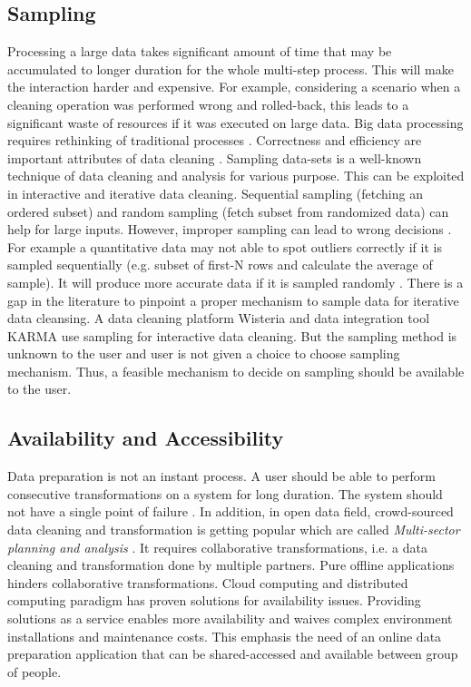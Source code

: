 \subsection{Sampling}
\noindent Processing a large data takes significant amount of time that may be accumulated to longer duration for the whole multi-step process. This will make the interaction harder and expensive. For example, considering a scenario when a cleaning operation was performed wrong and rolled-back, this leads to a significant waste of resources if it was executed on large data. Big data processing requires rethinking of traditional processes \cite{nemreport}. Correctness and efficiency are important attributes of data cleaning \cite{journals/corr/KrishnanW0FG16}. Sampling data-sets is a well-known technique of data cleaning and analysis \cite{Hellerstein08quantitativedata} for various purpose. This can be exploited in interactive and iterative data cleaning. Sequential sampling (fetching an ordered subset) and random sampling (fetch subset from randomized data) can help for large inputs. However, improper sampling can lead to wrong decisions \cite{journals/corr/KrishnanW0FG16}. For example a quantitative data may not able to spot outliers correctly if it is sampled sequentially (e.g. subset of first-N rows and calculate the average of sample). It will produce more accurate data if it is sampled randomly \cite{Hellerstein08quantitativedata}. There is a gap in the literature to pinpoint a proper mechanism to sample data for iterative data cleansing. A data cleaning platform Wisteria \cite{Wisteria} and data integration tool KARMA  \cite{knoblock15:aimag} use sampling for interactive data cleaning. But the sampling method is unknown to the user and user is not given a choice to choose sampling mechanism.  Thus, a feasible mechanism to decide on sampling should be available to the user.
\subsection{Availability and Accessibility}
\noindent Data preparation is not an instant process. A user should be able to perform consecutive transformations on a system for long duration. The system should not have a single point of failure \cite{mesa}.  In addition, in open data field, crowd-sourced data cleaning and transformation is getting popular which are called \textit{Multi-sector planning and analysis} \cite{multisectoranalysis}. It requires collaborative transformations, i.e. a data cleaning and transformation done by multiple partners. Pure offline applications hinders collaborative transformations. Cloud computing and distributed computing paradigm has proven solutions for availability issues. Providing solutions as a service enables more availability and waives complex environment installations and maintenance costs. This emphasis the need of an online data preparation application that can be shared-accessed and available between group of people.
